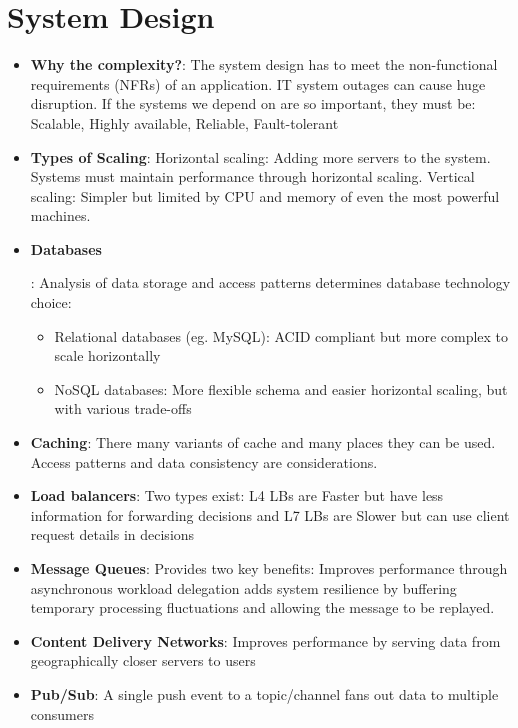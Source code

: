 \documentclass[letterpaper,11pt]{article}
\newcommand{\resumeItem}[2]{
  \item\small{
    \textbf{#1}{: #2 \vspace{-2pt}}
  }
}
\newcommand{\resumeSubItem}[2]{\resumeItem{#1}{#2}\vspace{-4pt}}
\newcommand{\resumeSubHeadingListStart}{\begin{itemize}[leftmargin=*]}
\newcommand{\resumeSubHeadingListEnd}{\end{itemize}}
\begin{document}
\section{System Design}
  \resumeSubHeadingListStart
      \resumeSubItem{Why the complexity?}
      {The system design has to meet the non-functional requirements (NFRs) of an application. IT system outages can cause huge disruption.  If the systems we depend on are so important, they must be: Scalable, Highly available, Reliable, Fault-tolerant}
      \resumeSubItem{Types of Scaling}
      {Horizontal scaling: Adding more servers to the system. Systems must maintain performance through horizontal scaling.\newline
      Vertical scaling: Simpler but limited by CPU and memory of even the most powerful machines.}
      \resumeSubItem{Databases}
      {Analysis of data storage and access patterns determines database technology choice:
        \begin{itemize}
          \item Relational databases (eg. MySQL): ACID compliant but more complex to scale horizontally
          \item NoSQL databases: More flexible schema and easier horizontal scaling, but with various trade-offs
        \end{itemize}}
      \resumeSubItem{Caching}
      {There many variants of cache and many places they can be used.  Access patterns and data consistency are considerations.}
      \resumeSubItem{Load balancers}
      {Two types exist: L4 LBs are Faster but have less information for forwarding decisions and L7 LBs are Slower but can use client request details in decisions}
      \resumeSubItem{Message Queues}
      {Provides two key benefits: Improves performance through asynchronous workload delegation adds system resilience by buffering temporary processing fluctuations and allowing the message to be replayed.}
      \resumeSubItem{Content Delivery Networks}
      {Improves performance by serving data from geographically closer servers to users}
      \resumeSubItem{Pub/Sub}
      {A single push event to a topic/channel fans out data to multiple consumers}
  \resumeSubHeadingListEnd
\end{document}
